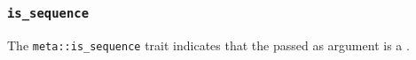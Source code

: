 
\subsubsection{\texttt{is\_sequence}}

The \texttt{meta::is\_sequence}
trait indicates that the  passed as argument is a .


